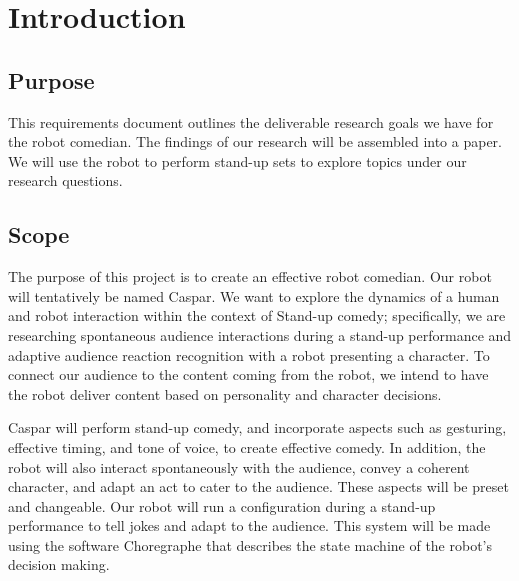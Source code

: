 \documentclass[onecolumn, draftclsnofoot,10pt, compsoc]{IEEEtran}
\begin{document}
\section{Introduction}

\subsection{Purpose}

This requirements document outlines the deliverable research goals we have for the robot comedian. The findings of our research will be assembled into a paper. We will use the robot to perform stand-up sets to explore topics under our research questions.

\subsection{Scope}

The purpose of this project is to create an effective robot comedian. Our robot will tentatively be named Caspar. We want to explore the dynamics of a human and robot interaction within the context of Stand-up comedy; specifically, we are researching spontaneous audience interactions during a stand-up performance and adaptive audience reaction recognition with a robot presenting a character. To connect our audience to the content coming from the robot, we intend to have the robot deliver content based on personality and character decisions.

Caspar will perform stand-up comedy, and incorporate aspects such as gesturing, effective timing, and tone of voice, to create effective comedy. In addition, the robot will also interact spontaneously with the audience, convey a coherent character, and adapt an act to cater to the audience. These aspects will be preset and changeable. Our robot will run a configuration during a stand-up performance to tell jokes and adapt to the audience. This system will be made using the software Choregraphe that describes the state machine of the robot’s decision making.
\end{document}
